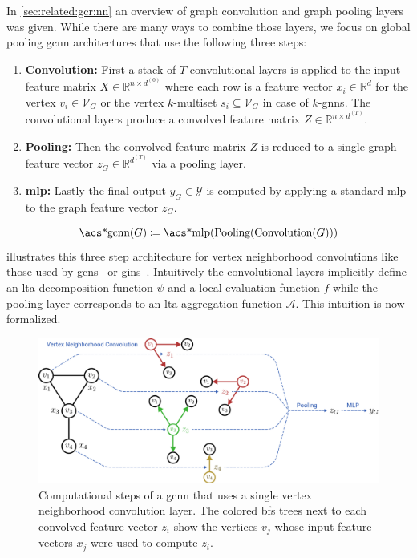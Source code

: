 In \cref{sec:related:gcr:nn} an overview of graph convolution and graph pooling layers was given.
While there are many ways to combine those layers, we focus on global pooling \ac{gcnn} architectures that use the following three steps:
\begin{enumerate}[label=\textbf{\arabic*.}]
	\item \textbf{Convolution:}
		First a stack of $T$ convolutional layers is applied to the input feature matrix $X \in \mathbb{R}^{n \times d^{(0)}}$ where each row is a feature vector $x_i \in \mathbb{R}^d$ for the vertex $v_i \in \mathcal{V}_G$ or the vertex $k$-multiset $s_i \subseteq \mathcal{V}_G$ in case of $k$-\acsp{gnn}.
		The convolutional layers produce a convolved feature matrix $Z \in \mathbb{R}^{n \times d^{(T)}}$.
	\item \textbf{Pooling:}
		Then the convolved feature matrix $Z$ is reduced to a single graph feature vector $z_G \in \mathbb{R}^{d^{(T)}}$ via a pooling layer.
	\item \textbf{\ac{mlp}:}
		Lastly the final output $y_G \in \mathcal{Y}$ is computed by applying a standard \ac{mlp} to the graph feature vector $z_G$.
\end{enumerate}
\[
	\text{\acs*{gcnn}}(G) \coloneqq \text{\acs*{mlp}}(\text{Pooling}(\text{Convolution}(G)))
\]
 illustrates this three step architecture for vertex neighborhood convolutions like those used by \acp{gcn}~\cite{Kipf2017} or \acp{gin}~\cite{Xu2018}.
Intuitively the convolutional layers implicitly define an \ac{lta} decomposition function $\psi$ and a local evaluation function $f$ while the pooling layer corresponds to an \ac{lta} aggregation function $\mathcal{A}$.
This intuition is now formalized.
\begin{figure}[ht]
	\centering
	\includegraphics[width=\linewidth]{gfx/graph-lta/gcnn-structure.pdf}
	\caption[Computational steps of a \ac{gcnn} that uses a single vertex neighborhood convolution layer.]{
		Computational steps of a \ac{gcnn} that uses a single vertex neighborhood convolution layer.
		The colored \ac{bfs} trees next to each convolved feature vector $z_i$ show the vertices $v_j$ whose input feature vectors $x_j$ were used to compute $z_i$.
	}\label{fig:ltag:gcnn-structure}
\end{figure}

